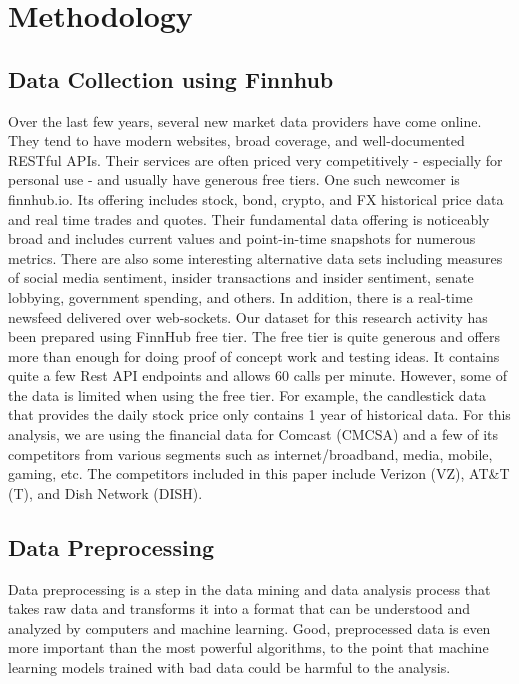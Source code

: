 \documentclass[conference]{IEEEtran}
\begin{document}
\section{Methodology}

\subsection{Data Collection using Finnhub}\label{AA}

Over the last few years, several new market data providers have come online. They tend to have modern websites, broad coverage, and well-documented RESTful APIs.
Their services are often priced very competitively - especially for personal use - and usually have generous free tiers.
One such newcomer is finnhub.io. Its offering includes stock, bond, crypto, and FX historical price data and real time trades and quotes.
Their fundamental data offering is noticeably broad and includes current values and point-in-time snapshots for numerous metrics.
There are also some interesting alternative data sets including measures of social media sentiment, insider transactions and insider sentiment, senate lobbying, government spending, and others.
In addition, there is a real-time newsfeed delivered over web-sockets.
Our dataset for this research activity has been prepared using FinnHub free tier.
The free tier is quite generous and offers more than enough for doing proof of concept work and testing ideas.
It contains quite a few Rest API endpoints and allows 60 calls per minute.
However, some of the data is limited when using the free tier.
For example, the candlestick data that provides the daily stock price only contains 1 year of historical data.
For this analysis, we are using the financial data for Comcast (CMCSA) and a few of its competitors from various segments such as internet/broadband, media, mobile, gaming, etc.
The competitors included in this paper include Verizon (VZ), AT&T (T), and Dish Network (DISH).

\subsection{Data Preprocessing }\label{AA}
Data preprocessing is a step in the data mining and data analysis process that takes raw data and transforms it into a format that can be understood and analyzed by computers and machine learning.
Good, preprocessed data is even more important than the most powerful algorithms, to the point that machine learning models trained with bad data could be harmful to the analysis.
\end{document}
